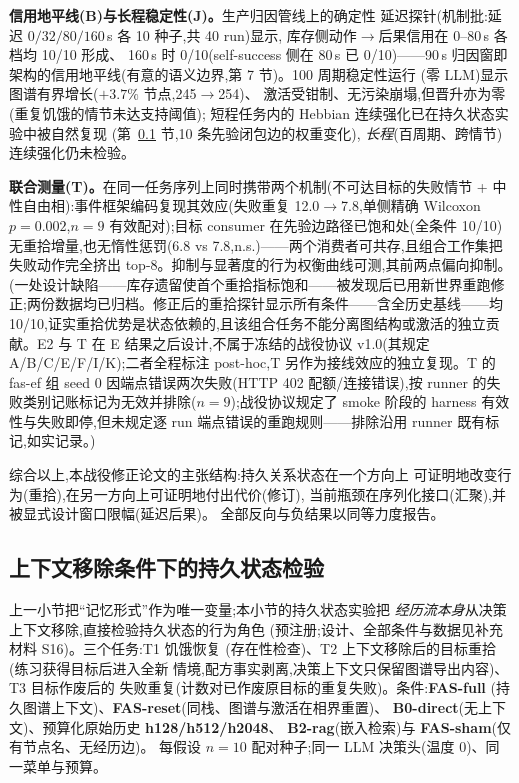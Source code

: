 \documentclass[10pt,a4paper]{ctexart}
\begin{document}
\textbf{信用地平线(B)与长程稳定性(J)。}生产归因管线上的确定性
延迟探针(机制批:延迟 $0/32/80/160$\,s 各 10 种子,共 40 run)显示,
库存侧动作$\rightarrow$后果信用在 0--80\,s 各档均 10/10 形成、
160\,s 时 0/10(self-success 侧在 80\,s 已 0/10)——90\,s 归因窗即
架构的信用地平线(有意的语义边界,第 7 节)。100 周期稳定性运行
(零 LLM)显示图谱有界增长($+3.7\%$ 节点,245$\rightarrow$254)、
激活受钳制、无污染崩塌,但晋升亦为零(重复饥饿的情节未达支持阈值);
短程任务内的 Hebbian 连续强化已在持久状态实验中被自然复现
(第~\ref{sec:res-psa} 节,10 条先验闭包边的权重变化),
\emph{长程}(百周期、跨情节)连续强化仍未检验。

\textbf{联合测量(T)。}在同一任务序列上同时携带两个机制(不可达目标的失败情节 + 中性自由相):事件框架编码复现其效应(失败重复 12.0$\rightarrow$7.8,单侧精确 Wilcoxon $p{=}0.002$,$n{=}9$ 有效配对);目标 consumer 在先验边路径已饱和处(全条件 10/10)无重拾增量,也无惰性惩罚(6.8 vs 7.8,n.s.)——两个消费者可共存,且组合工作集把失败动作完全挤出 top-8。抑制与显著度的行为权衡曲线可测,其前两点偏向抑制。(一处设计缺陷——库存遗留使首个重拾指标饱和——被发现后已用新世界重跑修正;两份数据均已归档。修正后的重拾探针显示所有条件——含全历史基线——均 10/10,证实重拾优势是状态依赖的,且该组合任务不能分离图结构或激活的独立贡献。E2 与 T 在 E 结果之后设计,不属于冻结的战役协议 v1.0(其规定 A/B/C/E/F/I/K);二者全程标注 post-hoc,T 另作为接线效应的独立复现。T 的 fas-ef 组 seed 0 因端点错误两次失败(HTTP 402 配额/连接错误),按 runner 的失败类别记账标记为无效并排除($n{=}9$);战役协议规定了 smoke 阶段的 harness 有效性与失败即停,但未规定逐 run 端点错误的重跑规则——排除沿用 runner 既有标记,如实记录。)

综合以上,本战役修正论文的主张结构:持久关系状态在一个方向上
可证明地改变行为(重拾),在另一方向上可证明地付出代价(修订),
当前瓶颈在序列化接口(汇聚),并被显式设计窗口限幅(延迟后果)。
全部反向与负结果以同等力度报告。

\subsection{上下文移除条件下的持久状态检验}
\label{sec:res-psa}

上一小节把``记忆形式''作为唯一变量;本小节的持久状态实验把
\emph{经历流本身}从决策上下文移除,直接检验持久状态的行为角色
(预注册;设计、全部条件与数据见补充材料 S16)。三个任务:T1 饥饿恢复
(存在性检查)、T2 上下文移除后的目标重拾(练习获得目标后进入全新
情境,配方事实剥离,决策上下文只保留图谱导出内容)、T3 目标作废后的
失败重复(计数对已作废原目标的重复失败)。条件:\textbf{FAS-full}
(持久图谱上下文)、\textbf{FAS-reset}(同栈、图谱与激活在相界重置)、
\textbf{B0-direct}(无上下文)、预算化原始历史 \textbf{h128/h512/h2048}、
\textbf{B2-rag}(嵌入检索)与 \textbf{FAS-sham}(仅有节点名、无经历边)。
每假设 $n{=}10$ 配对种子;同一 LLM 决策头(温度 0)、同一菜单与预算。
\end{document}
